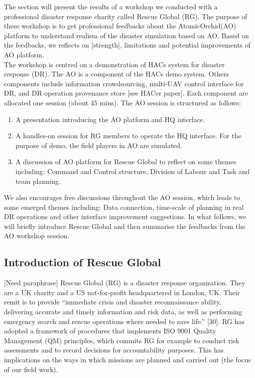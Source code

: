 The section will present the results of a workshop we conducted with a professional disaster response charity called Rescue Global (RG). The purpose of these workshop is to get professional feedbacks about the AtomicOrchid(AO) platform to understand realism of the disaster simulation based on AO. Based on the feedbacks, we reflects on [strength], limitations and potential improvements of AO platform. \\

The workshop is centred on a demonstration of HACs system for disaster response (DR). The AO is a component of the HACs demo system. Others components include information crowdsourcing, multi-UAV control interface for DR, and DR operation provenance store [see HACer paper]. Each component are allocated one session (about 45 mins). The AO session is structured as follows:\\

\begin{enumerate}
	\item A presentation introducing the AO platform and HQ interface.
	\item A handles-on session for RG members to operate the HQ interface. For the purpose of demo, the field players in AO are simulated.
	\item A discussion of AO platform for Rescue Global to reflect on some themes including: Command and Control structure, Division of Labour and Task and team planning.
\end{enumerate} 

We also encourages free discussions throughout the AO session, which leads to some emerged themes including: Data connection, time-scale of planning in real DR operations and other interface improvement suggestions. In what follows, we will briefly introduce Rescue Global and then summarise the feedbacks from the AO workshop session. 


\subsection{Introduction of Rescue Global}
[Need paraphrase] Rescue Global (RG) is a disaster response organisation. They are a UK charity and a US not-for-profit headquartered in London, UK. Their remit is to provide ``immediate crisis and disaster reconnaissance ability, delivering accurate and timely information and risk data, as well as performing emergency search and rescue operations where needed to save life.'' [30]. RG has adopted a framework of procedures that implements ISO 9001 Quality Management (QM) principles, which commits RG for example to conduct risk assessments and to record decisions for accountability purposes. This has implications on the ways in which missions are planned and carried out (the focus of our field work).\\


